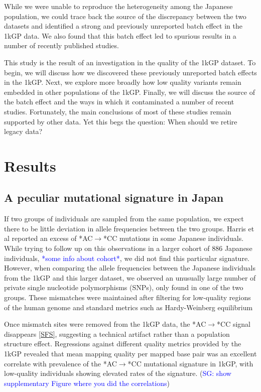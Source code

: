 \documentclass[9pt,lineno]{elife}
\newcommand{\sgcomment}[1]{\textcolor{blue}{SG: #1}}
\newcommand{\todo}[1]{\textcolor{blue}{*#1*}}
\begin{document}
While we were unable to reproduce the heterogeneity among the Japanese population, we could trace back the source of the discrepancy between the two datasets and identified a strong and previously unreported batch effect in the 1kGP data. We also found that this batch effect led to spurious results in a number of recently published studies. 

This study is the result of an investigation in the quality of the 1kGP dataset. 
To begin, we will discuss how we discovered these previously unreported batch effects in the 1kGP. 
Next, we explore more broadly how low quality variants remain embedded in other populations of the 1kGP. 
Finally, we will discuss the source of the batch effect and the ways in which it contaminated a number of recent studies.
Fortunately, the main conclusions of most of these studies remain supported by other data.
Yet this begs the question: When should we retire legacy data?

			\section{Results}
	\subsection{A peculiar mutational signature in Japan}			
If two groups of individuals are sampled from the same population, we expect there to be little deviation in allele frequencies between the two groups. 
Harris et al reported an excess of *AC${\rightarrow}$*CC mutations in some Japanese individuals. 
While trying to follow up on this observations in a larger cohort of 886 Japanese individuals, \todo{some info about cohort}, we did not find this particular signature.
However, when comparing the allele frequencies between the Japanese individuals from the 1kGP and this larger dataset, we observed an unusually large number of private single nucleotide polymorphisms (SNPs), only found in one of the two groups. 
These mismatches were maintained after filtering for low-quality regions of the human genome and standard metrics such as Hardy-Weinberg equilibrium

Once mismatch sites were removed from the 1kGP data, the  *AC${\rightarrow}$*CC signal disappears \ref{SFS}, suggesting a technical artifact rather than a population structure effect. Regressions against different quality metrics provided by the 1kGP revealed that mean mapping quality per mapped base pair was an excellent correlate with prevalence of the  *AC${\rightarrow}$*CC mutational signature in 1kGP, with low-quality individuals showing elevated rates of the signature. (\sgcomment{show supplementary Figure where you did the correlations})
 
\end{document}
